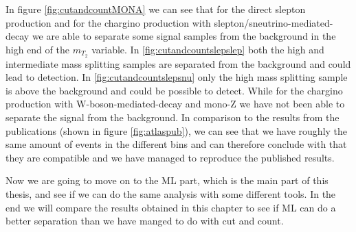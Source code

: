 In figure \ref{fig:cutandcountMONA} we can see that for the direct slepton production and for the chargino production with slepton/sneutrino-mediated-decay we are able to separate some signal samples from the background in the high end of the $m_{T_2}$ variable. In \ref{fig:cutandcountslepslep} both the high and intermediate mass splitting samples are separated from the background and could lead to detection. In \ref{fig:cutandcountslepsnu} only the high mass splitting sample is above the background and could be possible to detect. While for the chargino production with W-boson-mediated-decay and mono-Z we have not been able to separate the signal from the background. In comparison to the results from the publications (shown in figure \ref{fig:atlaspub}), we can see that we have roughly the same amount of events in the different bins and can therefore conclude with that they are compatible and we have managed to reproduce the published results.

Now we are going to move on to the ML part, which is the main part of this thesis, and see if we can do the same analysis with some different tools. In the end we will compare the results obtained in this chapter to see if ML can do a better separation than we have manged to do with cut and count.


























